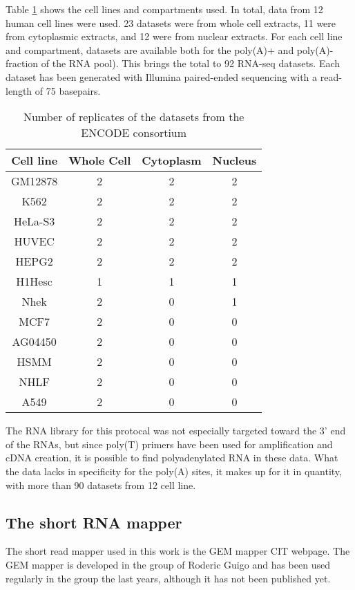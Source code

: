 Table \ref{tab:Datasets} shows the cell lines and compartments used. In total,
data from 12 human cell lines were used. 23 datasets were from whole cell
extracts, 11 were from cytoplasmic extracts, and 12 were from nuclear extracts.
For each cell line and compartment, datasets are available both for the
poly(A)+ and poly(A)- fraction of the RNA pool). This brings the total to 92
RNA-seq datasets. Each dataset has been generated with Illumina paired-ended
sequencing with a read-length of 75 basepairs.
\begin{table}
	\centering
	\begin{tabular}{cccc}
	  Cell line & Whole Cell & Cytoplasm & Nucleus \\
	  \midrule
	  GM12878 & 2 & 2 & 2 \\
	  K562 & 2 & 2 & 2 \\
	  HeLa-S3 & 2 & 2 & 2 \\
	  HUVEC & 2 & 2 & 2 \\
	  HEPG2 & 2 & 2 & 2 \\
	  H1Hesc & 1 & 1 & 1 \\
	  Nhek & 2 & 0 & 1 \\
	  MCF7 & 2 & 0 & 0 \\
	  AG04450 & 2 & 0 & 0 \\
	  HSMM & 2 & 0 & 0 \\
	  NHLF & 2 & 0 & 0 \\
	  A549 & 2 & 0 & 0 \\
	\end{tabular}
	\caption{Number of replicates of the datasets from the ENCODE consortium}
	\label{tab:Datasets}
\end{table}

The RNA library for this protocal was not especially targeted toward the 3' end
of the RNAs, but since poly(T) primers have been used for amplification and
cDNA creation, it is possible to find polyadenylated RNA in these data. What
the data lacks in specificity for the poly(A) sites, it makes up for it in
quantity, with more than 90 datasets from 12 cell line.

\subsection{The short RNA mapper}
The short read mapper used in this work is the GEM mapper CIT webpage. The GEM
mapper is developed in the group of Roderic Guigo and has been used regularly
in the group the last years, although it has not been published yet.

